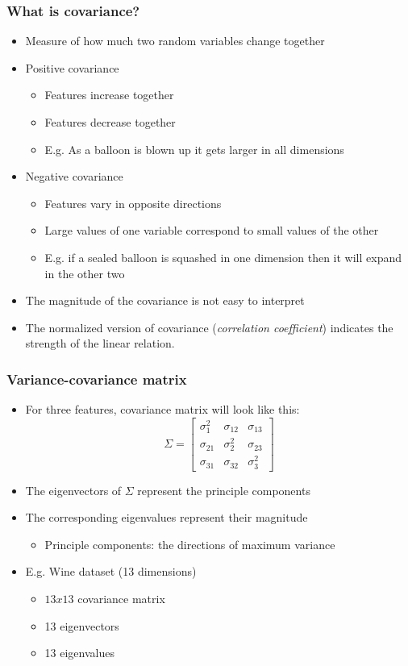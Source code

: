 \documentclass{beamer}
\begin{document}
\begin{frame}
  \frametitle{What is covariance?}
  \begin{itemize}
  \item Measure of how much two random variables change together
  \item Positive covariance
    \begin{itemize}
    \item Features increase together
    \item Features decrease together
    \item E.g. As a balloon is blown up it gets larger in all dimensions
    \end{itemize}
  \item Negative covariance
    \begin{itemize}
    \item Features vary in opposite directions
    \item Large values of one variable correspond to small values of the other
    \item E.g. if a sealed balloon is squashed in one dimension then it will expand in the other two
    \end{itemize}
  \item The magnitude of the covariance is not easy to interpret
  \item The normalized version of covariance (\textit{correlation coefficient})  indicates the strength of the linear relation.
  \end{itemize}
\end{frame}

\begin{frame}
  \frametitle{Variance-covariance matrix}
  \begin{itemize}
  \item For three features, covariance matrix will look like this:
    \[
    \Sigma = \begin{bmatrix}
      \sigma_{1}^2 & \sigma_{12} & \sigma_{13} \\
      \sigma_{21} & \sigma_{2}^{2} & \sigma_{23} \\
      \sigma_{31} & \sigma_{32} & \sigma_{3}^{2}
    \end{bmatrix}
    \]
  \item The eigenvectors of $\Sigma$ represent the principle components
  \item The corresponding eigenvalues represent their magnitude
    \begin{itemize}
    \item Principle components: the directions of maximum variance
    \end{itemize}
  \item E.g. Wine dataset (13 dimensions)
    \begin{itemize}
    \item $13x13$ covariance matrix
    \item 13 eigenvectors
    \item 13 eigenvalues
    \end{itemize}
  \end{itemize}
\end{frame}
\end{document}
